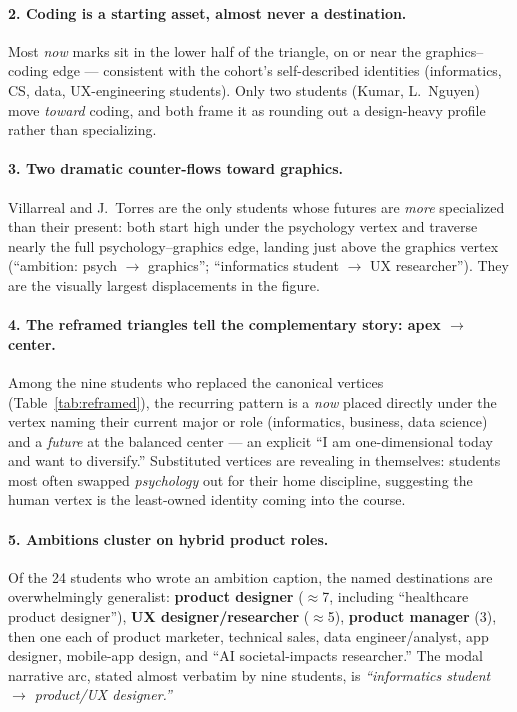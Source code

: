 \documentclass[11pt]{article}
\begin{document}
\paragraph{2. Coding is a starting asset, almost never a destination.} Most
\emph{now} marks sit in the lower half of the triangle, on or near the
graphics--coding edge --- consistent with the cohort's self-described
identities (informatics, CS, data, UX-engineering students). Only two students
(Kumar, L.~Nguyen) move \emph{toward} coding, and both frame it as rounding out
a design-heavy profile rather than specializing.

\paragraph{3. Two dramatic counter-flows toward graphics.} Villarreal and
J.~Torres are the only students whose futures are \emph{more} specialized than
their present: both start high under the psychology vertex and traverse nearly
the full psychology--graphics edge, landing just above the graphics vertex
(``ambition: psych $\to$ graphics''; ``informatics student $\to$ UX
researcher''). They are the visually largest displacements in the figure.

\paragraph{4. The reframed triangles tell the complementary story: apex
$\to$ center.} Among the nine students who replaced the canonical vertices
(Table~\ref{tab:reframed}), the recurring pattern is a \emph{now} placed
directly under the vertex naming their current major or role (informatics,
business, data science) and a \emph{future} at the balanced center --- an
explicit ``I am one-dimensional today and want to diversify.'' Substituted
vertices are revealing in themselves: students most often swapped
\emph{psychology} out for their home discipline, suggesting the human vertex is
the least-owned identity coming into the course.

\paragraph{5. Ambitions cluster on hybrid product roles.} Of the 24 students
who wrote an ambition caption, the named destinations are overwhelmingly
generalist: \textbf{product designer} ($\approx$7, including ``healthcare
product designer''), \textbf{UX designer/researcher} ($\approx$5),
\textbf{product manager} (3), then one each of product marketer, technical
sales, data engineer/analyst, app designer, mobile-app design, and ``AI
societal-impacts researcher.'' The modal narrative arc, stated almost
verbatim by nine students, is \emph{``informatics student $\to$
product/UX designer.''}
\end{document}
